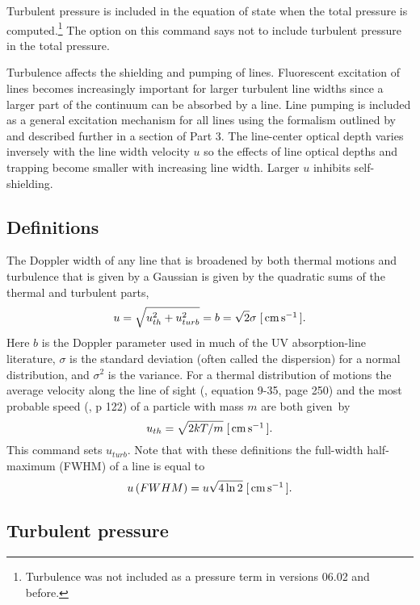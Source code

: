 Turbulent pressure is included in the equation of state when the total
pressure is computed.\footnote{Turbulence was not included as a pressure term in versions 06.02
and before.}
The 
option on this command says not to include turbulent pressure in the total
pressure.

Turbulence affects the shielding and pumping of lines.
Fluorescent
excitation of lines becomes increasingly important for larger turbulent
line widths since a larger part of the continuum can be absorbed by a line.
Line pumping is included as a general excitation mechanism for all lines
using the formalism outlined by \citet{Ferland1992} and described further in
a section of Part 3.
The line-center optical depth varies inversely with
the line width velocity $u$ so the effects of line optical depths
and trapping become smaller with increasing line width.
Larger $u$ inhibits self-shielding.

\subsection{Definitions }

The Doppler width of any line that is broadened by both thermal motions
and turbulence that is given by a Gaussian is given by the quadratic sums
of the thermal and turbulent parts,
\begin{equation}
u = \sqrt {u_{th}^2  + u_{turb}^2 }  = b = \sqrt 2 \sigma\;
 [\mbox{${\rm\thinspace cm}{\rm\thinspace s}^{-1}\,$} ].
\end{equation}
Here $b$ is the Doppler parameter used in much of the UV absorption-line
literature, $\sigma $ is the standard deviation
(often called the dispersion) for
a normal distribution, and $\sigma^2$ is the variance.
For a thermal distribution
of motions the average velocity along the line of sight
(\citealp{Mihalas1978}, equation 9-35, page 250)
and the most probable speed (\citealp{Novotny1973}, p 122)
of a particle with mass $m$ are both given~by
\begin{equation}
u_{th}  = \sqrt {2kT/m}\;
[\mbox{${\rm\thinspace cm}{\rm\thinspace s}^{-1}\,$} ].
\end{equation}
This command sets $u_{turb}$.
Note that with these definitions the full-width half-maximum
(FWHM) of a line is equal to
\begin{equation}
u\left( {FWHM} \right) = u\sqrt {4\ln 2}\;
[\mbox{${\rm\thinspace cm}{\rm\thinspace s}^{-1}\,$} ].
\end{equation}

\subsection{Turbulent pressure}

